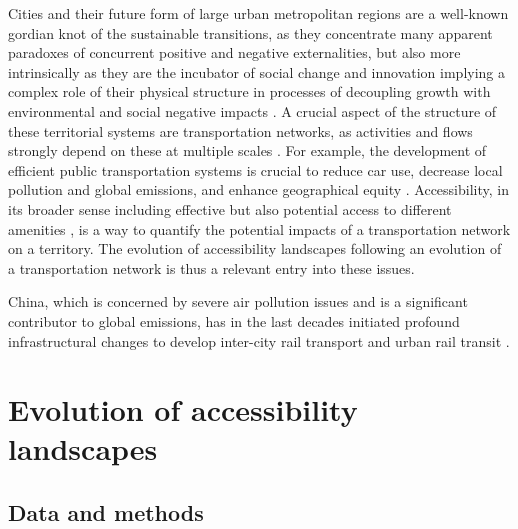 Cities and their future form of large urban metropolitan regions are a well-known gordian knot of the sustainable transitions, as they concentrate many apparent paradoxes of concurrent positive and negative externalities, but also more intrinsically as they are the incubator of social change and innovation \citep{pumain2009innovation} implying a complex role of their physical structure in processes of decoupling growth with environmental and social negative impacts \citep{bergeaud2018bel}. A crucial aspect of the structure of these territorial systems are transportation networks, as activities and flows strongly depend on these at multiple scales \citep{raimbault2018caracterisation}. For example, the development of efficient public transportation systems is crucial to reduce car use, decrease local pollution and global emissions, and enhance geographical equity \citep{sinha2003sustainability}. Accessibility, in its broader sense including effective but also potential access to different amenities \citep{bavoux2005geographie}, is a way to quantify the potential impacts of a transportation network on a territory. The evolution of accessibility landscapes following an evolution of a transportation network is thus a relevant entry into these issues.

China, which is concerned by severe air pollution issues and is a significant contributor to global emissions, has in the last decades initiated profound infrastructural changes to develop inter-city rail transport and urban rail transit .





\cite{hou2011transport}

\cite{jiao2014impacts}

\cite{lyu2016developing}


\section{Evolution of accessibility landscapes}





\subsection{Data and methods}


